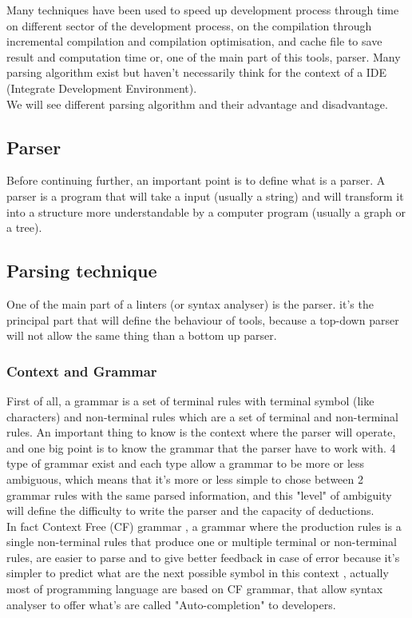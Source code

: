 Many techniques have been used to speed up development process through time on different sector of the development process, on the compilation through incremental compilation and compilation optimisation, and cache file to save result and computation time or, one of the main part of this tools, parser.
Many parsing algorithm exist but haven't necessarily think for the context of a IDE (Integrate Development Environment).
\\We will see different parsing algorithm and their advantage and disadvantage.
\subsection{Parser}
Before continuing further, an important point is to define what is a parser. A parser is a program that will take a input (usually a string) and will transform it into a structure more understandable by a computer program (usually a graph or a tree).\\

\subsection{Parsing technique}
One of the main part of a linters (or syntax analyser) is the parser. it's the principal part that will define the behaviour of tools, because a top-down parser will not allow the same thing than a bottom up parser.

\subsubsection{Context and Grammar}
First of all, a grammar is a set of terminal rules with terminal symbol (like characters) and non-terminal rules which are a set of terminal and non-terminal rules.
An important thing to know is the context where the parser will operate, and one big point is to know the grammar that the parser have to work with. 4 type of grammar exist\cite{grune2008parsing} and each type allow a grammar to be more or less ambiguous, which means that it's more or less simple to chose between 2 grammar rules with the same parsed information, and this "level" of ambiguity will define the difficulty to write the parser and the capacity of deductions.
\\In fact Context Free (CF) grammar \cite{cfg_def}, a grammar where the production rules is a single non-terminal rules that produce one or multiple terminal or non-terminal rules, are easier to parse and to give better feedback in case of error because it's simpler to predict what are the next possible symbol in this context \cite{grune2008parsing}, actually most of programming language are based on CF grammar, that allow syntax analyser to offer what's are called "Auto-completion" to developers. 


